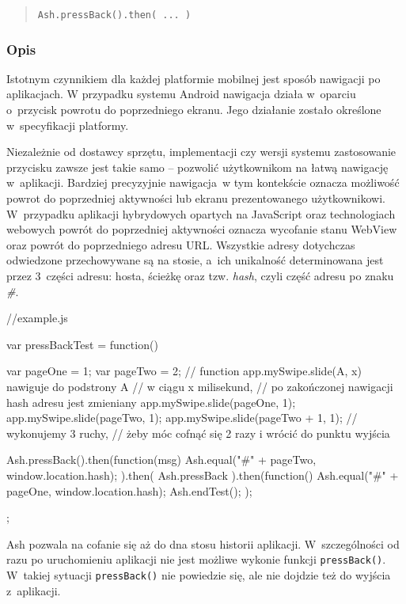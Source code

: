 \documentclass[brudnopis]{xmgr}
\begin{document}
\begin{quote}
  \texttt{Ash.pressBack().then( ... )} 
\end{quote}

\subsubsection{Opis}

Istotnym czynnikiem dla każdej platformie mobilnej jest sposób nawigacji po aplikacjach.  W przypadku systemu Android nawigacja działa w~oparciu o~przycisk powrotu do poprzedniego ekranu. Jego działanie zostało określone w~specyfikacji platformy.

Niezależnie od dostawcy sprzętu, implementacji czy wersji systemu zastosowanie przycisku zawsze jest takie samo -- pozwolić użytkownikom na łatwą nawigację w~aplikacji. Bardziej precyzyjnie nawigacja~w tym kontekście  oznacza możliwość powrot do poprzedniej aktywności lub ekranu prezentowanego użytkownikowi. W~przypadku aplikacji hybrydowych opartych na JavaScript oraz technologiach webowych powrót do poprzedniej aktywności oznacza wycofanie stanu WebView oraz powrót do poprzedniego adresu URL. Wszystkie adresy dotychczas odwiedzone przechowywane są na stosie, a~ich unikalność determinowana jest przez 3~części adresu: hosta, ścieżkę oraz tzw. \textit{hash}, czyli część adresu po znaku \textit{\#}. 

\begin{javascriptcode}
  //example.js

  var pressBackTest = function(){
    var pageOne = 1;
    var pageTwo = 2;
    // function app.mySwipe.slide(A, x) nawiguje do podstrony A 
    // w ciągu x milisekund,
    // po zakończonej nawigacji hash adresu jest zmieniany
    app.mySwipe.slide(pageOne, 1); 
    app.mySwipe.slide(pageTwo, 1); 
    app.mySwipe.slide(pageTwo + 1, 1); //  wykonujemy 3 ruchy, 
       //  żeby móc cofnąć się 2 razy i wrócić do punktu wyjścia 
    
    Ash.pressBack().then(function(msg){
      Ash.equal("#" + pageTwo, window.location.hash);
    }).then(
      Ash.pressBack
    ).then(function(){
      Ash.equal("#" + pageOne, window.location.hash);
      Ash.endTest();
    });
  };
\end{javascriptcode}

Ash pozwala na cofanie się aż do dna stosu historii aplikacji. W~szczególności od razu po uruchomieniu aplikacji nie jest możliwe wykonie funkcji \texttt{pressBack()}. W~takiej sytuacji \texttt{pressBack()} nie powiedzie się, ale nie dojdzie też do wyjścia z~aplikacji.
\end{document}
